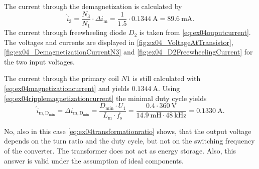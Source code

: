 \begin{solutionblock}
    The current through the demagnetization is calculated by
    \begin{equation}
        \hat{i}_\mathrm{3}=\frac{N_\mathrm{3}}{N_\mathrm{1}} \cdot \Delta i_\mathrm{m}
        =\frac{1}{1.5} \cdot \SI{0.1344}{\ampere}=\SI{89.6}{\milli\ampere}.
    \end{equation}
    The current through freewheeling diode $D_\mathrm{2}$ is taken from \eqref{eq:ex04ouputcurrent}.
    The voltages and currents are displayed in \autoref{fig:ex04_VoltageAtTransistor}, 
    \autoref{fig:ex04_DemagnetizationCurrentN3} and \autoref{fig:ex04_D2FreewheelingCurrent} for the two input voltages.
      
\end{solutionblock}
        
\begin{solutionblock}
    The current through the primary coil $N1$ is still calculated with \eqref{eq:ex04magnetizationcurrent} and yields
    $\SI{0.1344}{\ampere}$. 
    Using \eqref{eq:ex04ripplemagnetizationcurrent} the minimal duty cycle yields
    \begin{equation}
        \hat{i}_\mathrm{m,D_{min}}=\Delta i_\mathrm{m,D_{min}}= \frac{D_\mathrm{min} \cdot U_\mathrm{1}}{L_\mathrm{m} \cdot f_\mathrm{s}}
        =\frac{0.4 \cdot \SI{360}{\volt}}{\SI{14.9}{\milli\henry} \cdot \SI{48}{\kilo\hertz}}=\SI{0.1330}{\ampere}.
    \end{equation}
\end{solutionblock}


\begin{solutionblock}
    No,  also in this case \eqref{eq:ex04transformationratio} shows, that the output voltage depends on the turn ratio and the duty cycle,
    but not on the switching frequency of the converter. The transformer does not act as energy storage.
    Also, this answer is valid under the assumption of ideal components. 
\end{solutionblock}